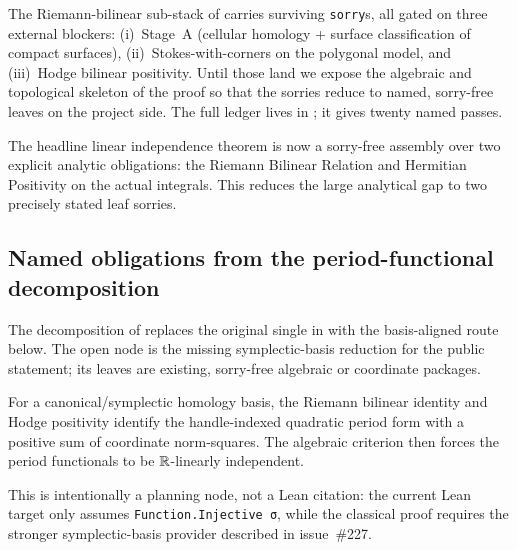 The Riemann-bilinear sub-stack of 
carries surviving \texttt{sorry}s, all gated on three external blockers:
(i)~Stage~A (cellular homology + surface classification of compact surfaces),
(ii)~Stokes-with-corners on the polygonal model, and (iii)~Hodge bilinear
positivity. Until those land we expose the algebraic and topological skeleton
of the proof so that the sorries reduce to named, sorry-free leaves on the
project side. The full ledger lives in
; it gives twenty
named passes.

The headline linear independence theorem 
is now a sorry-free assembly over two explicit analytic obligations:
the Riemann Bilinear Relation and Hermitian Positivity on the actual
integrals. This reduces the large analytical gap to two precisely
stated leaf sorries.

\subsection{Named obligations from the period-functional decomposition}
\label{subsec:named-obligations-period-functional}

The decomposition of 
replaces the original single  in
 with the basis-aligned route below.
The open node is the missing symplectic-basis reduction for the public
statement; its leaves are existing, sorry-free algebraic or coordinate
packages.

\begin{lemma}
\label{lem:riemann-classical-symplectic-basis-reduction}
For a canonical/symplectic homology basis, the Riemann bilinear identity and
Hodge positivity identify the handle-indexed quadratic period form with a
positive sum of coordinate norm-squares. The algebraic criterion then forces
the period functionals to be \(\mathbb{R}\)-linearly independent.

This is intentionally a planning node, not a Lean citation: the current Lean
target only assumes \lstinline{Function.Injective σ}, while the classical proof
requires the stronger symplectic-basis provider described in issue~\#227.
\end{lemma}

